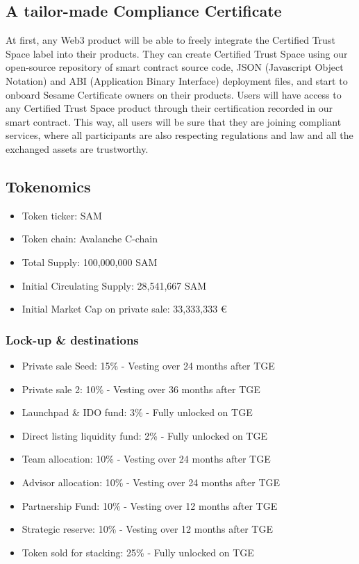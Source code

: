 ﻿\documentclass[a4paper]{article}
\let\OldTexttrademark\texttrademark
\renewcommand{\texttrademark}{\OldTexttrademark\xspace}%
\begin{document}
\subsection{A tailor-made Compliance Certificate} 
At first, any Web3 product will be able to freely integrate the Certified Trust Space\texttrademark label into their products. They can create Certified Trust Space\texttrademark using our open-source repository of smart contract source code, JSON (Javascript Object Notation) and ABI (Application Binary Interface) deployment files, and start to onboard Sesame Certificate owners on their products. Users will have access to any Certified Trust Space\texttrademark product through their certification recorded in our smart contract. This way, all users will be sure that they are joining compliant services, where all participants are also respecting regulations and law and all the exchanged assets are trustworthy.
\subsection{Tokenomics}
\begin{itemize}
\item Token ticker: SAM
\item Token chain: Avalanche C-chain
\item Total Supply: 100,000,000 SAM
\item Initial Circulating Supply: 28,541,667 SAM
\item Initial Market Cap on private sale:  33,333,333 €
\end{itemize}

\subsubsection{Lock-up \& destinations}
\begin{itemize}
\item Private sale Seed: 15\% - Vesting over 24 months after TGE
\item Private sale 2: 10\% - Vesting over 36 months after TGE
\item Launchpad \& IDO fund: 3\% - Fully unlocked on TGE
\item Direct listing liquidity fund: 2\% - Fully unlocked on TGE
\item Team allocation: 10\% - Vesting over 24 months after TGE
\item Advisor allocation: 10\% - Vesting over 24 months after TGE
\item Partnership Fund: 10\% - Vesting over 12 months after TGE
\item Strategic reserve: 10\% - Vesting over 12 months after TGE
\item Token sold for stacking: 25\% - Fully unlocked on TGE
\end{itemize}
\end{document}
